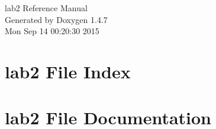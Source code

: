 \documentclass[a4paper]{book}
\begin{document}
\begin{titlepage}
\vspace*{7cm}
\begin{center}
{\Large lab2 Reference Manual}\\
\vspace*{1cm}
{\large Generated by Doxygen 1.4.7}\\
\vspace*{0.5cm}
{\small Mon Sep 14 00:20:30 2015}\\
\end{center}
\end{titlepage}
\clearemptydoublepage
{}
\tableofcontents
\clearemptydoublepage
{}
\chapter{lab2 File Index}

\chapter{lab2 File Documentation}




\printindex
\end{document}
